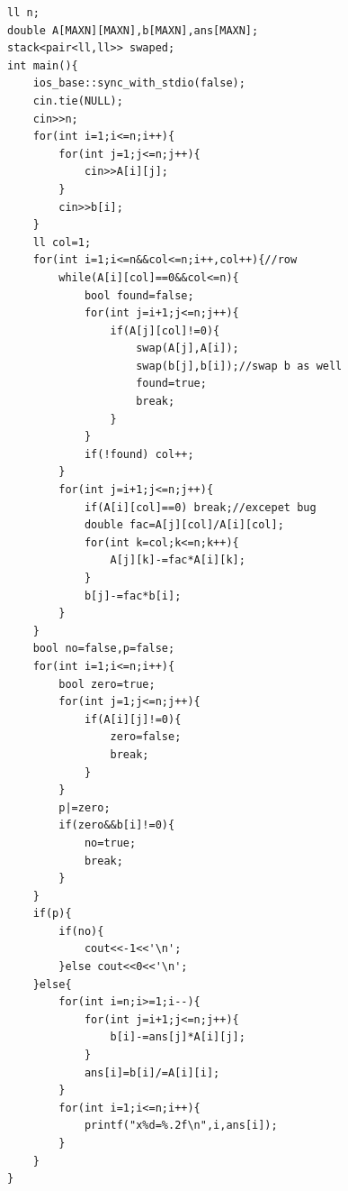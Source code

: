 
\begin{lstlisting}
ll n;
double A[MAXN][MAXN],b[MAXN],ans[MAXN];
stack<pair<ll,ll>> swaped;
int main(){
    ios_base::sync_with_stdio(false);
    cin.tie(NULL);
    cin>>n;
    for(int i=1;i<=n;i++){
        for(int j=1;j<=n;j++){
            cin>>A[i][j];
        }
        cin>>b[i];
    }
    ll col=1;
    for(int i=1;i<=n&&col<=n;i++,col++){//row
        while(A[i][col]==0&&col<=n){
            bool found=false;
            for(int j=i+1;j<=n;j++){
                if(A[j][col]!=0){
                    swap(A[j],A[i]);
                    swap(b[j],b[i]);//swap b as well
                    found=true;
                    break;
                }
            }
            if(!found) col++;
        }
        for(int j=i+1;j<=n;j++){
            if(A[i][col]==0) break;//excepet bug
            double fac=A[j][col]/A[i][col];
            for(int k=col;k<=n;k++){
                A[j][k]-=fac*A[i][k];
            }
            b[j]-=fac*b[i];
        }
    }
    bool no=false,p=false;
    for(int i=1;i<=n;i++){
        bool zero=true;
        for(int j=1;j<=n;j++){
            if(A[i][j]!=0){
                zero=false;
                break;
            }
        }
        p|=zero;
        if(zero&&b[i]!=0){
            no=true;
            break;
        }
    }
    if(p){
        if(no){
            cout<<-1<<'\n';
        }else cout<<0<<'\n';
    }else{
        for(int i=n;i>=1;i--){
            for(int j=i+1;j<=n;j++){
                b[i]-=ans[j]*A[i][j];
            }
            ans[i]=b[i]/=A[i][i];
        }
        for(int i=1;i<=n;i++){
            printf("x%d=%.2f\n",i,ans[i]);
        }
    }
}
\end{lstlisting}

